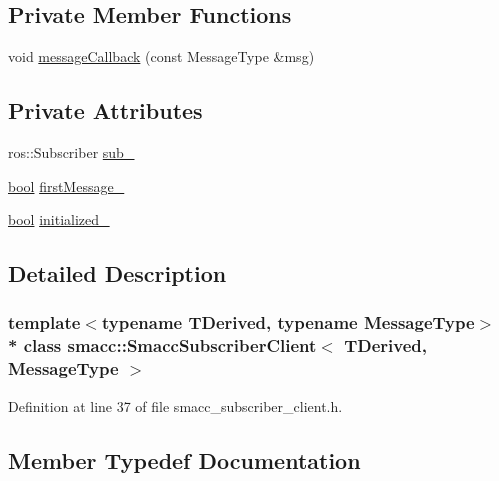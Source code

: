 \subsection*{Private Member Functions}
\begin{DoxyCompactItemize}
\item 
void \hyperlink{classsmacc_1_1SmaccSubscriberClient_aeeaa8569c2abca5ec9639f975d2c4226}{message\+Callback} (const Message\+Type \&msg)
\end{DoxyCompactItemize}
\subsection*{Private Attributes}
\begin{DoxyCompactItemize}
\item 
ros\+::\+Subscriber \hyperlink{classsmacc_1_1SmaccSubscriberClient_a1570353cc228141c8a401776e2ef31c9}{sub\+\_\+}
\item 
\hyperlink{classbool}{bool} \hyperlink{classsmacc_1_1SmaccSubscriberClient_acfb1bf9d488d40a55c61861e2bc39346}{first\+Message\+\_\+}
\item 
\hyperlink{classbool}{bool} \hyperlink{classsmacc_1_1SmaccSubscriberClient_a38ca48bff3e170c1cfd6acff9da7661c}{initialized\+\_\+}
\end{DoxyCompactItemize}


\subsection{Detailed Description}
\subsubsection*{template$<$typename T\+Derived, typename Message\+Type$>$\\*
class smacc\+::\+Smacc\+Subscriber\+Client$<$ T\+Derived, Message\+Type $>$}



Definition at line 37 of file smacc\+\_\+subscriber\+\_\+client.\+h.



\subsection{Member Typedef Documentation}

